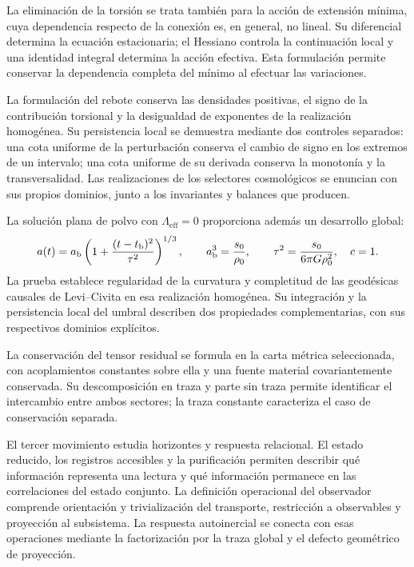 La eliminación de la torsión se trata también para la acción de
extensión mínima, cuya dependencia respecto de la conexión es, en
general, no lineal. Su diferencial determina la ecuación estacionaria;
el Hessiano controla la continuación local y una identidad integral
determina la acción efectiva. Esta formulación permite conservar la
dependencia completa del mínimo al efectuar las variaciones.

La formulación del rebote conserva las densidades positivas, el signo de
la contribución torsional y la desigualdad de exponentes de la realización
homogénea. Su persistencia local se demuestra mediante dos controles
separados: una cota uniforme de la perturbación conserva el cambio de
signo en los extremos de un intervalo; una cota uniforme de su derivada
conserva la monotonía y la transversalidad. Las realizaciones de los
selectores cosmológicos se enuncian con sus propios dominios, junto a los
invariantes y balances que producen.

La solución plana de polvo con \(\Lambda_{\mathrm{eff}}=0\)
proporciona además un desarrollo global:
\[
 a(t)=a_{\rm b}\left(1+
       \frac{(t-t_{\rm b})^2}{\tau^2}\right)^{1/3},
 \qquad
 a_{\rm b}^3=\frac{s_0}{\rho_0},\qquad
 \tau^2=\frac{s_0}{6\pi G\rho_0^2},
 \quad c=1.
\]
La prueba establece regularidad de la curvatura y completitud de las
geodésicas causales de Levi--Civita en esa realización homogénea.
Su integración y la persistencia local
del umbral describen dos propiedades complementarias, con sus
respectivos dominios explícitos.

La conservación del tensor residual se formula en la carta métrica
seleccionada, con acoplamientos constantes sobre ella y una fuente
material covariantemente conservada. Su descomposición en traza y parte
sin traza permite identificar el intercambio entre ambos sectores;
la traza constante caracteriza el caso de conservación separada.

El tercer movimiento estudia horizontes y respuesta relacional. El estado
reducido, los registros accesibles y la purificación permiten describir
qué información representa una lectura y qué información permanece en las
correlaciones del estado conjunto. La definición operacional del
observador comprende orientación y trivialización del transporte,
restricción a observables y proyección al subsistema. La respuesta
autoinercial se conecta con esas operaciones mediante la factorización
por la traza global y el defecto geométrico de proyección.

